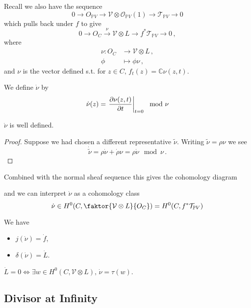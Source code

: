 \documentclass{article}
\begin{document}
Recall we also have the sequence 
\[
0 \to O_{\mathbb{P}V} \to \mathcal{V} \otimes \mathcal{O}_{\mathbb{P}V}(1) \to \mathcal{T}_{\mathbb{P}V} \to 0
\]
which pulls back under $f$ to give 
\[
0 \to O_C \overset{\nu}{\to} \mathcal{V} \otimes L \to f^\ast \mathcal{T}_{\mathbb{P}V} \to 0 \, ,
\]
where
\begin{align*}
    \nu : O_C &\to \mathcal{V} \otimes L \, ,\\
    \phi &\mapsto \phi \nu \, ,
\end{align*} 
and $\nu$ is the vector defined s.t. for $z \in C, \, f_t(z) = \mathbb{C}\nu(z,t)$.
\begin{definition}
We define $\dot{\nu}$ by 
\[
\dot{\nu}(z) = \left. \frac{\partial \nu(z,t)}{\partial t} \right\rvert_{t=0} \mod \nu 
\]
\end{definition}
\begin{lemma}
	$\dot{\nu}$ is well defined.
\end{lemma}
\begin{proof}
	Suppose we had chosen a different representative $\tilde{\nu}$. Writing $\tilde{\nu} = \rho \nu$ we see 
	\[
	\dot{\tilde{\nu}} = \rho \dot{\nu} + \dot{\rho} \nu = \rho \dot{\nu} \mod \nu \, .
	\]
\end{proof}
Combined with the normal sheaf sequence this gives the cohomology diagram
\begin{center}
\end{center}
and we can interpret $\dot{\nu}$ as a cohomology class 
\[
\dot{\nu} \in {H^0(C,\faktor{\mathcal{V} \otimes L}{O_C})} = H^0(C,f^\ast \mathcal{T}_{\mathbb{P}V})
\]
\begin{prop}
	We have 
	\begin{itemize}
		\item $j(\dot{\nu}) = \dot{f}$,
		\item $\delta(\dot{\nu}) = \dot{L}$. 
	\end{itemize}
\end{prop}
\begin{corollary}
	$\dot{L}=0 \Leftrightarrow \exists w \in H^0(C,\mathcal{V} \otimes L), \, \dot{\nu} = \tau(w)$. 
\end{corollary}

\subsection{Divisor at Infinity}




\end{document}

